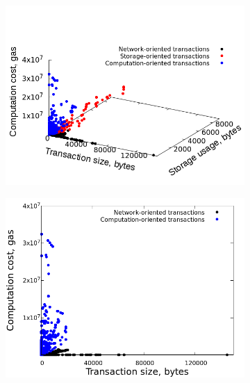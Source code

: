 \documentclass[]{llncs}   %
\begin{document}
\begin{figure}[h]
    \centering
    \begin{subfigure}[b]{0.48\textwidth}
        \includegraphics[width=\textwidth]{figures/txs3d}
        \caption{}
        \label{fig:a}
    \end{subfigure}
    \begin{subfigure}[b]{0.48\textwidth}
        \includegraphics[width=\textwidth]{figures/txs-size-computation}
        \caption{}
        \label{fig:b}
    \end{subfigure}


\end{figure}
\end{document}
